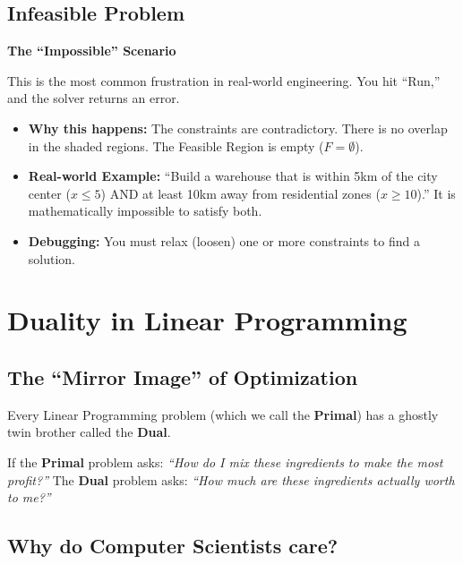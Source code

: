 \documentclass[
  letterpaper,
  DIV=11,
  numbers=noendperiod]{scrreprt}
\providecommand{\tightlist}{%
  \setlength{\itemsep}{0pt}\setlength{\parskip}{0pt}}
\begin{document}
\subsection{Infeasible Problem}\label{infeasible-problem}

\textbf{The ``Impossible'' Scenario}

This is the most common frustration in real-world engineering. You hit
``Run,'' and the solver returns an error.

\begin{itemize}
\tightlist
\item
  \textbf{Why this happens:} The constraints are contradictory. There is
  no overlap in the shaded regions. The Feasible Region is empty
  (\(F = \emptyset\)).
\item
  \textbf{Real-world Example:} ``Build a warehouse that is within 5km of
  the city center (\(x \le 5\)) AND at least 10km away from residential
  zones (\(x \ge 10\)).'' It is mathematically impossible to satisfy
  both.
\item
  \textbf{Debugging:} You must relax (loosen) one or more constraints to
  find a solution.
\end{itemize}

\section{Duality in Linear
Programming}\label{duality-in-linear-programming}

\subsection{The ``Mirror Image'' of
Optimization}\label{the-mirror-image-of-optimization}

Every Linear Programming problem (which we call the \textbf{Primal}) has
a ghostly twin brother called the \textbf{Dual}.

If the \textbf{Primal} problem asks: \emph{``How do I mix these
ingredients to make the most profit?''} The \textbf{Dual} problem asks:
\emph{``How much are these ingredients actually worth to me?''}

\subsection{Why do Computer Scientists
care?}\label{why-do-computer-scientists-care}
\end{document}
